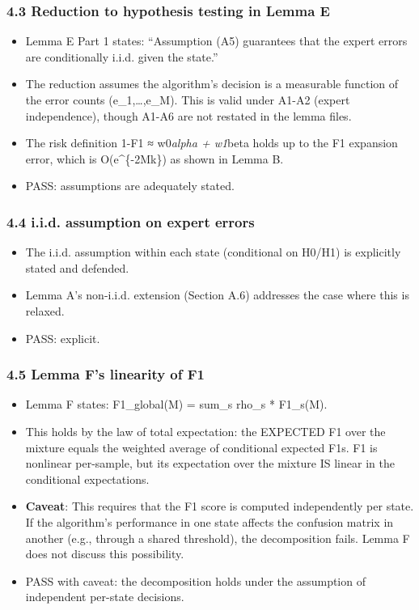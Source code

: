 \documentclass[
  12pt,
]{ctexart}
\providecommand{\tightlist}{%
  \setlength{\itemsep}{0pt}\setlength{\parskip}{0pt}}
\begin{document}
\subsubsection{4.3 Reduction to hypothesis testing in Lemma
E}\label{reduction-to-hypothesis-testing-in-lemma-e}

\begin{itemize}
\tightlist
\item
  Lemma E Part 1 states: ``Assumption (A5) guarantees that the expert
  errors are conditionally i.i.d. given the state.''
\item
  The reduction assumes the algorithm's decision is a measurable
  function of the error counts (e\_1,\ldots,e\_M). This is valid under
  A1-A2 (expert independence), though A1-A6 are not restated in the
  lemma files.
\item
  The risk definition 1-F1 ≈ w0\emph{alpha + w1}beta holds up to the F1
  expansion error, which is O(e\^{}\{-2Mk\}) as shown in Lemma B.
\item
  PASS: assumptions are adequately stated.
\end{itemize}

\subsubsection{4.4 i.i.d. assumption on expert
errors}\label{i.i.d.-assumption-on-expert-errors}

\begin{itemize}
\tightlist
\item
  The i.i.d. assumption within each state (conditional on H0/H1) is
  explicitly stated and defended.
\item
  Lemma A's non-i.i.d. extension (Section A.6) addresses the case where
  this is relaxed.
\item
  PASS: explicit.
\end{itemize}

\subsubsection{4.5 Lemma F's linearity of
F1}\label{lemma-fs-linearity-of-f1}

\begin{itemize}
\tightlist
\item
  Lemma F states: F1\_global(M) = sum\_s rho\_s * F1\_s(M).
\item
  This holds by the law of total expectation: the EXPECTED F1 over the
  mixture equals the weighted average of conditional expected F1s. F1 is
  nonlinear per-sample, but its expectation over the mixture IS linear
  in the conditional expectations.
\item
  \textbf{Caveat}: This requires that the F1 score is computed
  independently per state. If the algorithm's performance in one state
  affects the confusion matrix in another (e.g., through a shared
  threshold), the decomposition fails. Lemma F does not discuss this
  possibility.
\item
  PASS with caveat: the decomposition holds under the assumption of
  independent per-state decisions.
\end{itemize}
\end{document}

